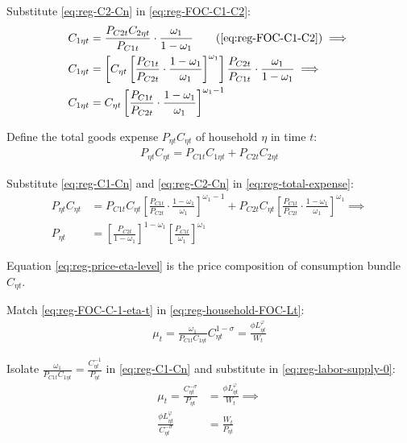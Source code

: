 \documentclass[
thesis.tex
]{subfiles}
\begin{document}
Substitute \ref{eq:reg-C2-Cn} in \ref{eq:reg-FOC-C1-C2}:
\begin{align}
	C_{1\eta t} &= \frac{P_{C2t} C_{2\eta t}}{P_{C1t}} \cdot \frac{\omega_1}{1 -\omega_1} \tag{\ref{eq:reg-FOC-C1-C2}} \implies \nonumber \\
	C_{1\eta t} &= \left[ C_{\eta t} \left[ \frac{P_{C1t} }{P_{C2t}} \cdot \frac{1 -\omega_1}{\omega_1} \right]^{\omega_1} \right] \frac{P_{C2t}}{P_{C1t}} \cdot \frac{\omega_1}{1 -\omega_1} \implies \nonumber \\
	C_{1\eta t} &= C_{\eta t} \left[ \frac{P_{C1t} }{P_{C2t}} \cdot \frac{1 -\omega_1}{\omega_1} \right]^{\omega_1 -1} \label{eq:reg-C1-Cn}
\end{align}

Define the total goods expense $P_{\eta t} C_{\eta t}$ of household $\eta$ in time $t$:
\begin{align}
	P_{\eta t} C_{\eta t} = P_{C1 t} C_{1\eta t} + P_{C2 t} C_{2\eta t} \label{eq:reg-total-expense}
\end{align}

Substitute \ref{eq:reg-C1-Cn} and \ref{eq:reg-C2-Cn} in \ref{eq:reg-total-expense}:
\begin{align}
	P_{\eta t} C_{\eta t} &= P_{C1 t} C_{\eta t} \left[ \frac{P_{C1t} }{P_{C2t}} \cdot \frac{1 -\omega_1}{\omega_1} \right]^{\omega_1 -1} + P_{C2 t} C_{\eta t} \left[ \frac{P_{C1t} }{P_{C2t}} \cdot \frac{1 -\omega_1}{\omega_1} \right]^{\omega_1} \implies \nonumber \\
	P_{\eta t} &= \left[ \frac{P_{C2t}}{1 -\omega_1} \right]^{1 -\omega_1} \left[ \frac{P_{C1t}}{\omega_1} \right]^{\omega_1} \label{eq:reg-price-eta-level}
\end{align}

Equation \ref{eq:reg-price-eta-level} is the price composition of consumption bundle $C_{\eta t}$.

Match \ref{eq:reg-FOC-C-1-eta-t} in \ref{eq:reg-household-FOC-Lt}:
\begin{align}
	\mu_t = \frac{\omega_1}{P_{C1t} C_{1\eta t}} C_{\eta t}^{1 -\sigma} = \frac{\phi L_{\eta t}^{\varphi}}{W_t} \label{eq:reg-labor-supply-0}
\end{align}

Isolate $ \frac{\omega_1}{P_{C1t} C_{1\eta t}} = \frac{C_{\eta t}^{-1}}{P_{\eta t}} $ in \ref{eq:reg-C1-Cn} and substitute in \ref{eq:reg-labor-supply-0}:
\begin{align}
	\mu_t = \frac{C_{\eta t}^{-\sigma}}{P_{\eta t}} &= \frac{\phi L_{\eta t}^{\varphi}}{W_t} \implies \label{eq:reg-FOC-Ct}\\
	\frac{\phi L_{\eta t}^{\varphi}}{C_{\eta t}^{-\sigma}} &= \frac{W_t}{P_{\eta t}} \label{eq:reg-labor-supply}
\end{align}
\end{document}
